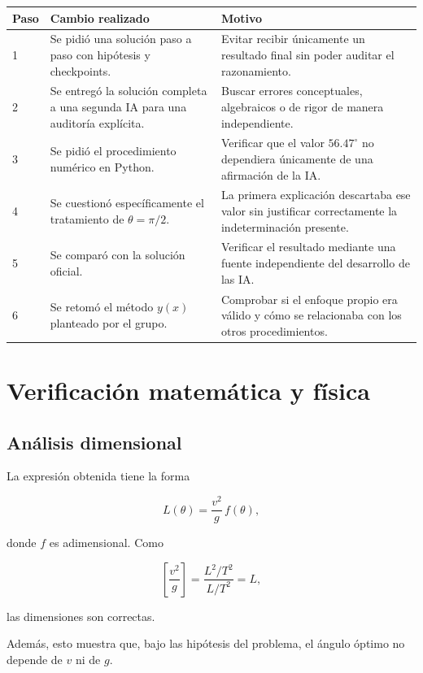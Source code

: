 \begin{center}
\begin{tabular}{p{1.2cm}p{5.7cm}p{7cm}}
\toprule
\textbf{Paso} & \textbf{Cambio realizado} & \textbf{Motivo}\\
\midrule
1 & Se pidió una solución paso a paso con hipótesis y checkpoints. & Evitar recibir únicamente un resultado final sin poder auditar el razonamiento.\\
2 & Se entregó la solución completa a una segunda IA para una auditoría explícita. & Buscar errores conceptuales, algebraicos o de rigor de manera independiente.\\
3 & Se pidió el procedimiento numérico en Python. & Verificar que el valor \(56.47^\circ\) no dependiera únicamente de una afirmación de la IA.\\
4 & Se cuestionó específicamente el tratamiento de \(\theta=\pi/2\). & La primera explicación descartaba ese valor sin justificar correctamente la indeterminación presente.\\
5 & Se comparó con la solución oficial. & Verificar el resultado mediante una fuente independiente del desarrollo de las IA.\\
6 & Se retomó el método \(y(x)\) planteado por el grupo. & Comprobar si el enfoque propio era válido y cómo se relacionaba con los otros procedimientos.\\
\bottomrule
\end{tabular}
\end{center}

\section{Verificación matemática y física}

\subsection{Análisis dimensional}

La expresión obtenida tiene la forma

\[
L(\theta)=\frac{v^2}{g}\,f(\theta),
\]

donde \(f\) es adimensional. Como

\[
\left[\frac{v^2}{g}\right]
=
\frac{L^2/T^2}{L/T^2}
=
L,
\]

las dimensiones son correctas.

Además, esto muestra que, bajo las hipótesis del problema, el ángulo óptimo no depende de \(v\) ni de \(g\).

